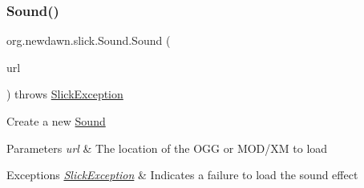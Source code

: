 \subsubsection{\texorpdfstring{Sound()}{Sound()}\hspace{0.1cm}{\footnotesize\ttfamily [2/3]}}
{\footnotesize\ttfamily org.\+newdawn.\+slick.\+Sound.\+Sound (\begin{DoxyParamCaption}\item[{U\+RL}]{url }\end{DoxyParamCaption}) throws \mbox{\hyperlink{classorg_1_1newdawn_1_1slick_1_1_slick_exception}{Slick\+Exception}}\hspace{0.3cm}{\ttfamily [inline]}}

Create a new \mbox{\hyperlink{classorg_1_1newdawn_1_1slick_1_1_sound}{Sound}}


\begin{DoxyParams}{Parameters}
{\em url} & The location of the O\+GG or M\+O\+D/\+XM to load \\
\hline
\end{DoxyParams}

\begin{DoxyExceptions}{Exceptions}
{\em \mbox{\hyperlink{classorg_1_1newdawn_1_1slick_1_1_slick_exception}{Slick\+Exception}}} & Indicates a failure to load the sound effect \\
\hline
\end{DoxyExceptions}

